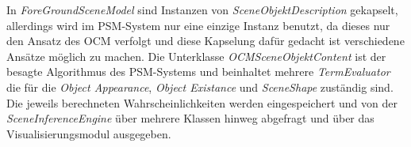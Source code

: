 In \textit{ForeGroundSceneModel} sind Instanzen von \textit{SceneObjektDescription} gekapselt, allerdings wird im PSM-System nur eine einzige Instanz benutzt, da dieses nur den Ansatz des OCM verfolgt und diese Kapselung dafür gedacht ist verschiedene Ansätze möglich zu machen. Die Unterklasse \textit{OCMSceneObjektContent} ist der besagte Algorithmus des PSM-Systems und beinhaltet mehrere \textit{TermEvaluator} die für die \textit{Object Appearance}, \textit{Object Existance} und \textit{SceneShape} zuständig sind.\smallskip\\
Die jeweils berechneten Wahrscheinlichkeiten werden eingespeichert und von der \textit{SceneInferenceEngine} über mehrere Klassen hinweg abgefragt und über das Visualisierungsmodul ausgegeben.\cite{gehrung14}




